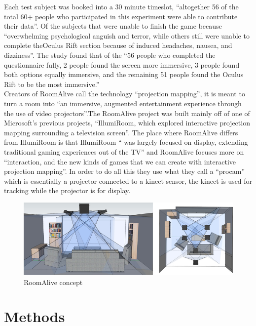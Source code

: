 \documentclass[a4paper]{article}
\begin{document}
Each test subject was booked into a 30 minute timeslot, “altogether 56 of the total 60+ people who participated in this experiment were able to contribute their data”\cite{7}. Of the subjects that were unable to finish the game because “overwhelming psychological anguish and terror, while others still were unable to complete theOculus Rift section because of induced headaches, nausea, and dizziness”\cite{7}. The study found that of the “56 people who completed the questionnaire fully, 2 people found the screen more immersive, 3 people found both options equally immersive, and the remaining 51 people found the Oculus Rift to be the most immersive.”\cite{7}\\
\indent Creators of RoomAlive call the technology “projection mapping”, it is meant to turn a room into “an immersive, augmented entertainment experience through the use of video projectors”\cite{6}.The RoomAlive project was built mainly off of one of Microsoft's previous projects, “IllumiRoom, which explored interactive projection mapping surrounding a television screen”\cite{6}. The place where RoomAlive differs from IllumiRoom is that IllumiRoom “ was largely focused on display, extending traditional gaming experiences out of the TV”\cite{6} and RoomAlive focuses more on “interaction, and the new kinds of games that we can create with interactive projection mapping”\cite{6}. In order to do all this they use what they call a “procam” which is essentially a projector connected to a kinect sensor, the kinect is used for tracking while the projector is for display.

\begin{figure}
\centering
\includegraphics[scale=0.4]{roomalive.jpg}
\caption{RoomAlive concept}
\end{figure}



\section{Methods}
\end{document}
